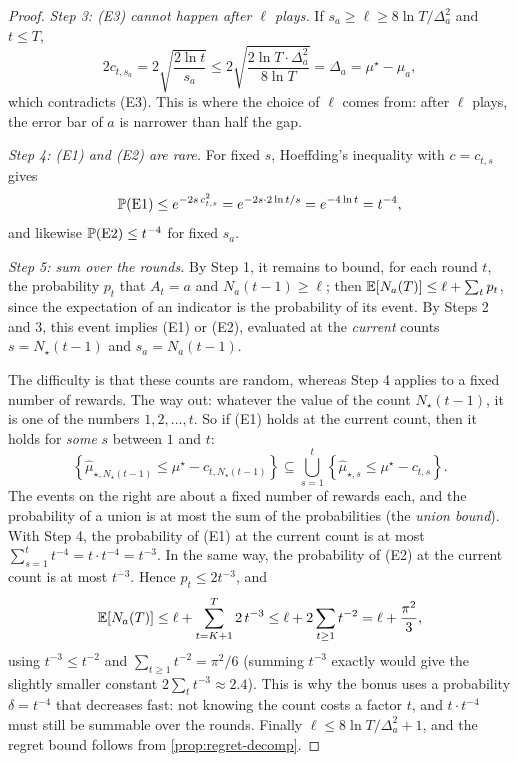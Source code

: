 \begin{proof}
  \emph{Step 3: (E3) cannot happen after $\ell$ plays.} If $s_a \geq \ell
  \geq 8 \ln T / \Delta_a^2$ and $t \leq T$,
  \begin{equation*}
    2 c_{t, s_a} = 2 \sqrt{\frac{2 \ln t}{s_a}} \leq 2 \sqrt{\frac{2 \ln T
    \cdot \Delta_a^2}{8 \ln T}} = \Delta_a = \mu^\star - \mu_a,
  \end{equation*}
  which contradicts (E3). This is where the choice of $\ell$ comes from:
  after $\ell$ plays, the error bar of $a$ is narrower than half the gap.

  \emph{Step 4: (E1) and (E2) are rare.} For fixed $s$, Hoeffding's
  inequality with $c = c_{t, s}$ gives
  \begin{equation*}
    \mathbb{P}(\text{E1}) \leq e^{-2 s\, c_{t, s}^2} = e^{-2 s \cdot 2 \ln t / s} =
    e^{-4 \ln t} = t^{-4},
  \end{equation*}
  and likewise $\mathbb{P}(\text{E2}) \leq t^{-4}$ for fixed $s_a$.

  \emph{Step 5: sum over the rounds.} By Step 1, it remains to bound, for
  each round $t$, the probability $p_t$ that $A_t = a$ and $N_a(t-1) \geq
  \ell$; then $\mathbb{E}[N_a(T)] \leq \ell + \sum_t p_t$, since the expectation
  of an indicator is the probability of its event. By Steps 2 and 3, this
  event implies (E1) or (E2), evaluated at the \emph{current} counts $s =
  N_\star(t-1)$ and $s_a = N_a(t-1)$.

  The difficulty is that these counts are random, whereas Step 4 applies
  to a fixed number of rewards. The way out: whatever the value of the
  count $N_\star(t-1)$, it is one of the numbers $1, 2, \dots, t$. So if
  (E1) holds at the current count, then it holds for \emph{some} $s$
  between $1$ and $t$:
  \begin{equation*}
    \left\{ \hat\mu_{\star, N_\star(t-1)} \leq \mu^\star - c_{t,
    N_\star(t-1)} \right\} \subseteq \bigcup_{s=1}^{t} \left\{
    \hat\mu_{\star, s} \leq \mu^\star - c_{t, s} \right\}.
  \end{equation*}
  The events on the right are about a fixed number of rewards each, and
  the probability of a union is at most the sum of the probabilities (the
  \emph{union bound}). With Step 4, the probability of (E1) at the current
  count is at most $\sum_{s=1}^{t} t^{-4} = t \cdot t^{-4} = t^{-3}$. In
  the same way, the probability of (E2) at the current count is at most
  $t^{-3}$. Hence $p_t \leq 2 t^{-3}$, and
  \begin{equation*}
    \mathbb{E}[N_a(T)] \leq \ell + \sum_{t=K+1}^{T} 2\, t^{-3}
    \leq \ell + 2 \sum_{t \geq 1} t^{-2} = \ell + \frac{\pi^2}{3},
  \end{equation*}
  using $t^{-3} \leq t^{-2}$ and $\sum_{t \geq 1} t^{-2} = \pi^2 / 6$
  (summing $t^{-3}$ exactly would give the slightly smaller constant
  $2 \sum_t t^{-3} \approx 2.4$). This is why the bonus uses a probability
  $\delta = t^{-4}$ that decreases fast: not knowing the count costs a
  factor $t$, and $t \cdot t^{-4}$ must still be summable over the rounds.
  Finally $\ell \leq 8 \ln T / \Delta_a^2 + 1$, and the regret bound
  follows from \cref{prop:regret-decomp}.
\end{proof}

